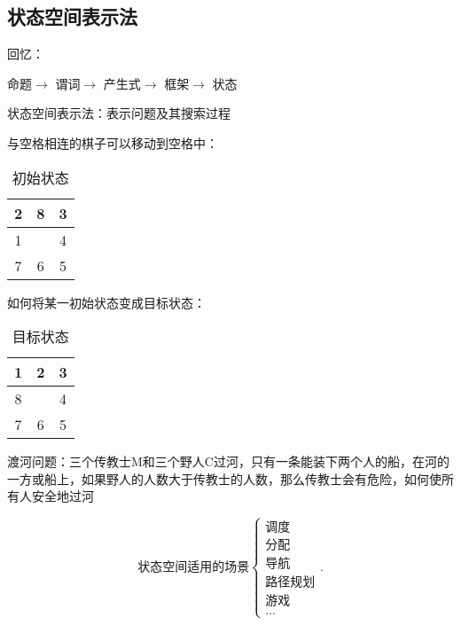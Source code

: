 \subsection{状态空间表示法}%
\label{sub:状态空间表示法}
\begin{notation}
    回忆：

    命题$\to $ 谓词$\to $ 产生式$\to $ 框架$\to $ 状态
\end{notation}
\begin{defi}
    状态空间表示法：表示问题及其搜索过程
\end{defi}
\begin{eg}
    与空格相连的棋子可以移动到空格中：
    \begin{table}[htpb]
        \centering
        \caption{初始状态}
        \label{tab:初始状态}
        \begin{tabular}{|c|c|c|}
        \hline
        2 & 8 & 3 \\
        \hline
        1 &   & 4 \\
        \hline
        7 & 6 & 5\\
        \hline
        \end{tabular}
    \end{table}

    如何将某一初始状态变成目标状态：
    \begin{table}[htpb]
        \centering
        \caption{目标状态}
        \label{tab:目标状态}
        \begin{tabular}{|c|c|c|}
        \hline
        1 & 2 & 3 \\
        \hline
        8 &   & 4 \\
        \hline
        7 & 6 & 5\\
        \hline
        \end{tabular}
    \end{table}
\end{eg}
\begin{eg}
    渡河问题：三个传教士M和三个野人C过河，只有一条能装下两个人的船，在河的一方或船上，如果野人的人数大于传教士的人数，那么传教士会有危险，如何使所有人安全地过河
\end{eg}
\[
    \text{状态空间适用的场景}
    \begin{cases}
        \text{调度}\\
        \text{分配}\\
        \text{导航}\\
        \text{路径规划}\\
        \text{游戏}\\
        \ldots
    \end{cases}
.\] 
